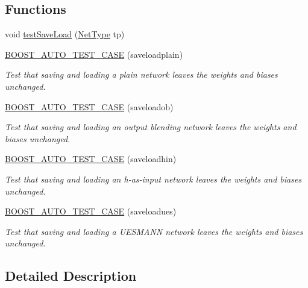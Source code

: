 \subsection*{Functions}
\begin{DoxyCompactItemize}
\item 
void \hyperlink{group__saveloadtests_gad10c7697c92534686096093ed5706651}{test\+Save\+Load} (\hyperlink{netType_8hpp_a1526df0fc932ccf720aa26267f923213}{Net\+Type} tp)
\item 
\hyperlink{group__saveloadtests_gaaae2c86d5c5efd62cb1c60b59cb5468e}{B\+O\+O\+S\+T\+\_\+\+A\+U\+T\+O\+\_\+\+T\+E\+S\+T\+\_\+\+C\+A\+SE} (saveloadplain)
\begin{DoxyCompactList}\small\item\em Test that saving and loading a plain network leaves the weights and biases unchanged. \end{DoxyCompactList}\item 
\hyperlink{group__saveloadtests_gab6e4f80a52c26911259372b0048b22e5}{B\+O\+O\+S\+T\+\_\+\+A\+U\+T\+O\+\_\+\+T\+E\+S\+T\+\_\+\+C\+A\+SE} (saveloadob)
\begin{DoxyCompactList}\small\item\em Test that saving and loading an output blending network leaves the weights and biases unchanged. \end{DoxyCompactList}\item 
\hyperlink{group__saveloadtests_gaaf7006daed225b7600e44f29c559f1f4}{B\+O\+O\+S\+T\+\_\+\+A\+U\+T\+O\+\_\+\+T\+E\+S\+T\+\_\+\+C\+A\+SE} (saveloadhin)
\begin{DoxyCompactList}\small\item\em Test that saving and loading an h-\/as-\/input network leaves the weights and biases unchanged. \end{DoxyCompactList}\item 
\hyperlink{group__saveloadtests_ga37edbb51abe933e20c379601ab099983}{B\+O\+O\+S\+T\+\_\+\+A\+U\+T\+O\+\_\+\+T\+E\+S\+T\+\_\+\+C\+A\+SE} (saveloadues)
\begin{DoxyCompactList}\small\item\em Test that saving and loading a U\+E\+S\+M\+A\+NN network leaves the weights and biases unchanged. \end{DoxyCompactList}\end{DoxyCompactItemize}


\subsection{Detailed Description}


